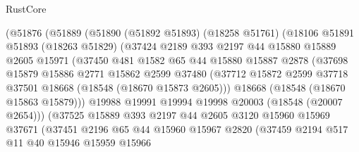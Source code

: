 \begin{lexlean}{RustCore}
\begin{coremodule}
                (@51876
                  (@51889
                    (@51890
                      (@51892 @51893)
                      (@18258 @51761)
                      (@18106
                        @51891
                        @51893
                        (@18263 @51829)
                        (@37424
                          @2189
                          @393
                          @2197
                          @44
                          @15880
                          @15889
                          @2605
                          @15971
                          (@37450
                            @481
                            @1582
                            @65
                            @44
                            @15880
                            @15887
                            @2878
                            (@37698
                              @15879
                              @15886
                              @2771
                              @15862
                              @2599
                              @37480
                              (@37712
                                @15872
                                @2599
                                @37718
                                @37501
                                @18668
                                (@18548 (@18670 @15873 @2605)))
                              @18668
                              (@18548 (@18670 @15863 @15879)))
                            @19988
                            @19991
                            @19994
                            @19998
                            @20003
                            (@18548 (@20007 @2654)))
                          (@37525
                            @15889
                            @393
                            @2197
                            @44
                            @2605
                            @3120
                            @15960
                            @15969
                            @37671
                            (@37451
                              @2196
                              @65
                              @44
                              @15960
                              @15967
                              @2820
                              (@37459
                                @2194
                                @517
                                @11
                                @40
                                @15946
                                @15959
                                @15966

\end{coremodule}
\end{lexlean}
